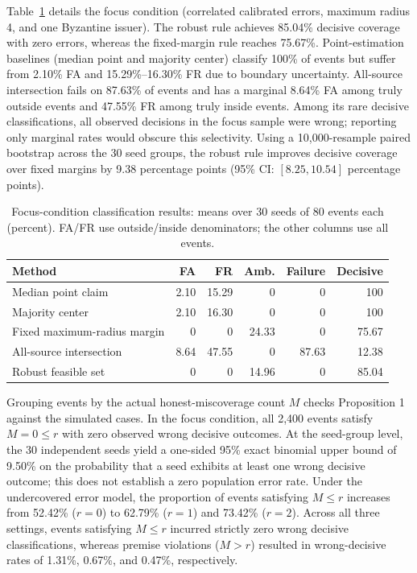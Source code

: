 Table~\ref{tab:semantic} details the focus condition (correlated calibrated errors, maximum radius 4, and one Byzantine issuer). The robust rule achieves 85.04\% decisive coverage with zero errors, whereas the fixed-margin rule reaches 75.67\%. Point-estimation baselines (median point and majority center) classify 100\% of events but suffer from 2.10\% FA and 15.29\%--16.30\% FR due to boundary uncertainty. All-source intersection fails on 87.63\% of events and has a marginal 8.64\% FA among truly outside events and 47.55\% FR among truly inside events. Among its rare decisive classifications, all observed decisions in the focus sample were wrong; reporting only marginal rates would obscure this selectivity. Using a 10,000-resample paired bootstrap across the 30 seed groups, the robust rule improves decisive coverage over fixed margins by 9.38 percentage points (95\% CI: $[8.25, 10.54]$ percentage points).



\begin{table}[htbp]\centering\small
\caption{Focus-condition classification results: means over 30 seeds of 80 events each (percent). FA/FR use outside/inside denominators; the other columns use all events.}\label{tab:semantic}
\begin{tabular}{lrrrrr}\toprule
Method&FA&FR&Amb.&Failure&Decisive\\\midrule
Median point claim&2.10&15.29&0&0&100\\
Majority center&2.10&16.30&0&0&100\\
Fixed maximum-radius margin&0&0&24.33&0&75.67\\
All-source intersection&8.64&47.55&0&87.63&12.38\\
Robust feasible set&0&0&14.96&0&85.04\\\bottomrule
\end{tabular}\end{table}

Grouping events by the actual honest-miscoverage count $M$ checks Proposition 1 against the simulated cases. In the focus condition, all 2,400 events satisfy $M = 0 \le r$ with zero observed wrong decisive outcomes. At the seed-group level, the 30 independent seeds yield a one-sided 95\% exact binomial upper bound of 9.50\% on the probability that a seed exhibits at least one wrong decisive outcome; this does not establish a zero population error rate. Under the undercovered error model, the proportion of events satisfying $M \le r$ increases from 52.42\% ($r = 0$) to 62.79\% ($r = 1$) and 73.42\% ($r = 2$). Across all three settings, events satisfying $M \le r$ incurred strictly zero wrong decisive classifications, whereas premise violations ($M > r$) resulted in wrong-decisive rates of 1.31\%, 0.67\%, and 0.47\%, respectively.

